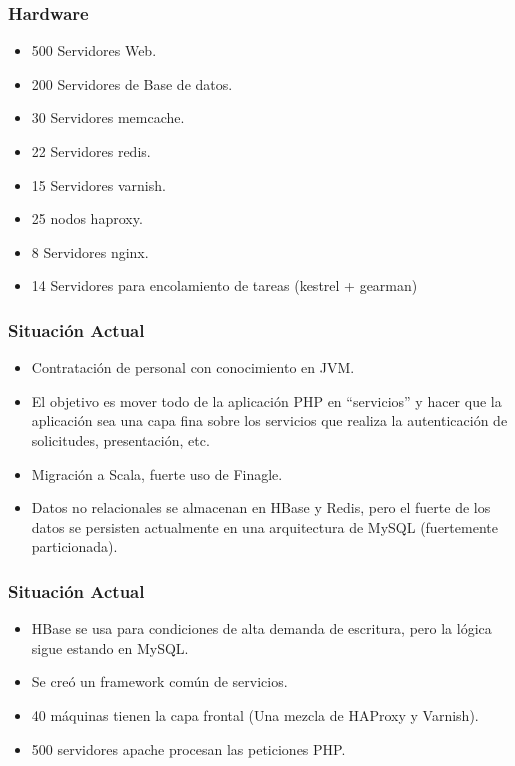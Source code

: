 \documentclass[12pt]{beamer}
\begin{document}
\begin{frame}
 \frametitle{Hardware}
 \begin{multicols}{2}
    \begin{itemize}
     \item 500 Servidores Web.
     \item 200 Servidores de Base de datos.
     \item 30 Servidores memcache.
     \item 22 Servidores redis.
     \item 15 Servidores varnish.
     \item 25 nodos haproxy.
     \item 8 Servidores nginx.
     \item 14 Servidores para encolamiento de tareas (kestrel + gearman)
    \end{itemize}
  \end{multicols}
\end{frame}


\begin{frame}
 \frametitle{Situación Actual}
 \begin{itemize}
  \item<2-> Contratación de personal con conocimiento en JVM.
  \item<3-> El objetivo es mover todo de la aplicación PHP en ``servicios'' y hacer que la aplicación sea una capa fina sobre los servicios que realiza la autenticación de solicitudes, presentación, etc.
  \item<4-> Migración a Scala, fuerte uso de Finagle.
  \item<5-> Datos no relacionales se almacenan en HBase y Redis, pero el fuerte de los datos se persisten actualmente en una arquitectura de MySQL (fuertemente particionada).
 \end{itemize}
\end{frame}


\begin{frame}
 \frametitle{Situación Actual}
 \begin{itemize}
  \item<2-> HBase se usa para condiciones de alta demanda de escritura, pero la lógica sigue estando en MySQL.
  \item<3-> Se creó un framework común de servicios.
  \item<4-> 40 máquinas tienen la capa frontal (Una mezcla de HAProxy y Varnish).
  \item<5-> 500 servidores apache procesan las peticiones PHP.
 \end{itemize}
\end{frame}
\end{document}
